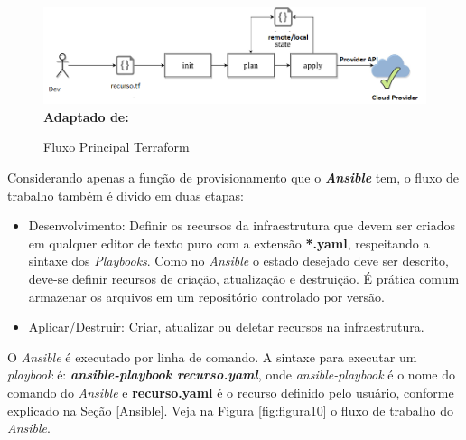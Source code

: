 \begin{figure}[H]
	\centering	
	\caption[\hspace{0.1cm}Fluxo Principal Terraform]{Fluxo Principal Terraform}
	\vspace{-0.4cm}
	\includegraphics[width=1.0\textwidth]{artigo/figuras/terraform_single_workflow.png}
	 \vspace{-0.2cm}
	\\\textbf{\footnotesize Adaptado de: \cite{Turbinskii}}
	\label{fig:figura9}
\end{figure}
\vspace{-0.5cm}

\hfill

Considerando apenas a função de provisionamento que o \textbf{\textit{Ansible}} tem, o fluxo de trabalho também é divido em duas etapas:

\begin{itemize}
  \item Desenvolvimento: Definir os recursos da infraestrutura que devem ser criados em qualquer editor de texto puro com a extensão \textbf{*.yaml}, respeitando a sintaxe dos \textit{Playbooks}. Como no \textit{Ansible} o estado desejado deve ser descrito, deve-se definir recursos de criação, atualização e destruição.  É prática comum armazenar os arquivos em um repositório controlado por versão. 
  \item Aplicar/Destruir: Criar, atualizar ou deletar recursos na infraestrutura. 
\end{itemize}

O \textit{Ansible} é executado por linha de comando. A sintaxe para executar um \textit{playbook} é: \textbf{\textit{ansible-playbook recurso.yaml}}, onde \textit{ansible-playbook} é o nome do comando do \textit{Ansible} e \textbf{recurso.yaml} é o recurso definido pelo usuário, conforme explicado na Seção \ref{Ansible}. Veja na Figura \ref{fig:figura10} o fluxo de trabalho do \textit{Ansible}.   


